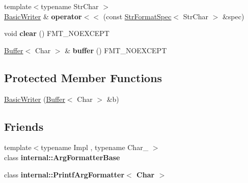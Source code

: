 \begin{DoxyCompactItemize}
\item 
{\footnotesize template$<$typename Str\+Char $>$ }\\\hyperlink{classfmt_1_1BasicWriter}{Basic\+Writer} \& {\bfseries operator$<$$<$} (const \hyperlink{classfmt_1_1StrFormatSpec}{Str\+Format\+Spec}$<$ Str\+Char $>$ \&spec)\hypertarget{classfmt_1_1BasicWriter_a79c23ed8ee17ee205ece04571f0dd79b}{}\label{classfmt_1_1BasicWriter_a79c23ed8ee17ee205ece04571f0dd79b}

\item 
void {\bfseries clear} () F\+M\+T\+\_\+\+N\+O\+E\+X\+C\+E\+PT\hypertarget{classfmt_1_1BasicWriter_aa5b6f4dd01854cbc3ebf06a7f2fce713}{}\label{classfmt_1_1BasicWriter_aa5b6f4dd01854cbc3ebf06a7f2fce713}

\item 
\hyperlink{classfmt_1_1Buffer}{Buffer}$<$ Char $>$ \& {\bfseries buffer} () F\+M\+T\+\_\+\+N\+O\+E\+X\+C\+E\+PT\hypertarget{classfmt_1_1BasicWriter_a9b2a71d2ec402005fca013111bb576cb}{}\label{classfmt_1_1BasicWriter_a9b2a71d2ec402005fca013111bb576cb}

\end{DoxyCompactItemize}
\subsection*{Protected Member Functions}
\begin{DoxyCompactItemize}
\item 
\hyperlink{classfmt_1_1BasicWriter_a586c21bbbd38149bcf48fc30376afc9c}{Basic\+Writer} (\hyperlink{classfmt_1_1Buffer}{Buffer}$<$ Char $>$ \&b)
\end{DoxyCompactItemize}
\subsection*{Friends}
\begin{DoxyCompactItemize}
\item 
{\footnotesize template$<$typename Impl , typename Char\+\_\+ $>$ }\\class {\bfseries internal\+::\+Arg\+Formatter\+Base}\hypertarget{classfmt_1_1BasicWriter_ac5db94b13180b25196a6e027c6efbfd7}{}\label{classfmt_1_1BasicWriter_ac5db94b13180b25196a6e027c6efbfd7}

\item 
class {\bfseries internal\+::\+Printf\+Arg\+Formatter$<$ Char $>$}\hypertarget{classfmt_1_1BasicWriter_a2a042c0745c912819e720759d8b498ae}{}\label{classfmt_1_1BasicWriter_a2a042c0745c912819e720759d8b498ae}

\end{DoxyCompactItemize}


